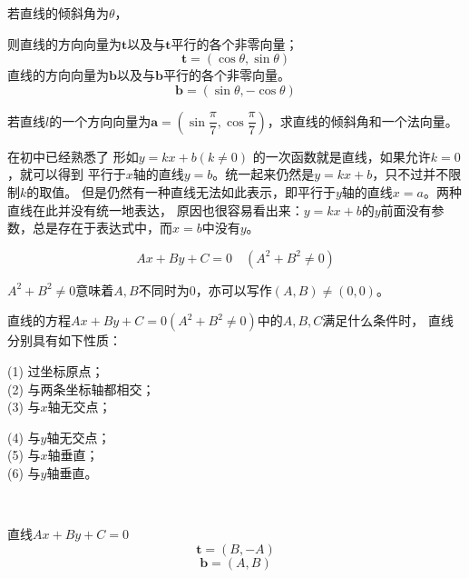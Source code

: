 \begin{definition}[直线的方向向量与法向量]
    若直线的倾斜角为\(\theta\)，
    
    则直线的方向向量为\( \mathbf{t}\)以及与\( \mathbf{t}\)平行的各个非零向量；
    \begin{equation}
        \mathbf{t}=(\cos \theta,\sin \theta)
    \end{equation}
    直线的方向向量为\( \mathbf{b}\)以及与\( \mathbf{b}\)平行的各个非零向量。
    \begin{equation}
        \mathbf{b}=(\sin\theta,-\cos\theta)
    \end{equation}
\end{definition}
\begin{example}
    若直线\(l\)的一个方向向量为\(\mathbf{a}=\left(\sin\dfrac{\pi}{7},\cos\dfrac{\pi}{7}\right)\)，求直线的倾斜角和一个法向量。
\end{example}

在初中已经熟悉了
形如\(y=kx+b(k\neq 0)\)
的一次函数就是直线，如果允许\(k=0\)，就可以得到
平行于\(x\)轴的直线\(y=b\)。统一起来仍然是\(y=kx+b\)，只不过并不限制\(k\)的取值。
但是仍然有一种直线无法如此表示，即平行于$y$轴的直线\(x=a\)。两种直线在此并没有统一地表达，
原因也很容易看出来：\(y=kx+b\)的\(y\)前面没有参数，总是存在于表达式中，而\(x=b\)中没有\(y\)。

\begin{definition}[直线的一般式方程]
\begin{equation}
    Ax+By+C=0\quad(A^2+B^2\neq 0)
\end{equation}
\end{definition}
\(A^2+B^2\neq 0\)意味着\(A,B\)不同时为\(0\)，亦可以写作\((A,B)\neq (0,0)\)。
\begin{example}
    直线的方程$Ax+By+C=0(A^2+B^2\neq0)$中的\(A,B,C\)满足什么条件时，
直线分别具有如下性质：
\begin{minipage}[t]{0.45\textwidth}
    (1) 过坐标原点； \\
    (2) 与两条坐标轴都相交； \\
    (3) 与$x$轴无交点；
    \end{minipage}
    \hfill
    \begin{minipage}[t]{0.45\textwidth}
    (4) 与$y$轴无交点；\\
    (5) 与$x$轴垂直；\\
    (6) 与$y$轴垂直。
\end{minipage}
\end{example}

\begin{theorem}[一般式方程的方向向量与法向量]
    \ 

    直线\(Ax+By+C=0\)
    \begin{equation}
        \mathbf{t}=(B,-A)
    \end{equation}
    \begin{equation}
        \mathbf{b}=(A,B)
    \end{equation}
    
\end{theorem}


